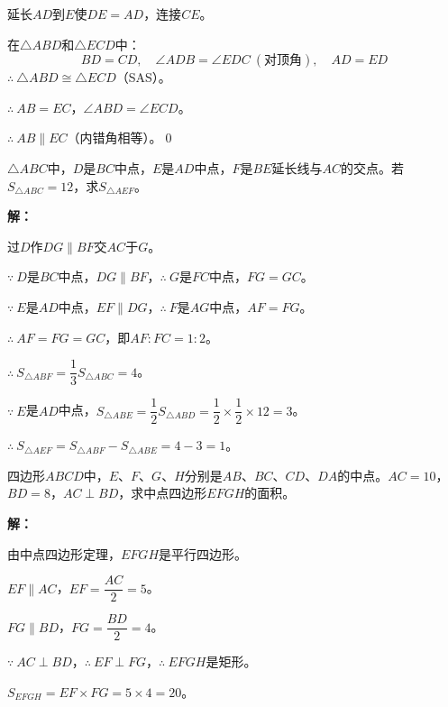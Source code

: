 \documentclass[12pt, a4paper]{ctexart}
\begin{document}
\begin{proofbox}[【证明】倍长中线]
延长$AD$到$E$使$DE = AD$，连接$CE$。

在$\triangle ABD$和$\triangle ECD$中：
\[
BD = CD,\quad \angle ADB = \angle EDC\ (\text{对顶角}),\quad AD = ED
\]
$\therefore\ \triangle ABD \cong \triangle ECD$（SAS）。

$\therefore\ AB = EC$，$\angle ABD = \angle ECD$。

$\therefore\ AB \parallel EC$（内错角相等）。\qed
\end{proofbox}

\begin{examplebox}[【例题13】倍长中线经典题]
$\triangle ABC$中，$D$是$BC$中点，$E$是$AD$中点，$F$是$BE$延长线与$AC$的交点。若$S_{\triangle ABC} = 12$，求$S_{\triangle AEF}$。
\end{examplebox}

\textbf{解：}

过$D$作$DG \parallel BF$交$AC$于$G$。

$\because\ D$是$BC$中点，$DG \parallel BF$，$\therefore\ G$是$FC$中点，$FG = GC$。

$\because\ E$是$AD$中点，$EF \parallel DG$，$\therefore\ F$是$AG$中点，$AF = FG$。

$\therefore\ AF = FG = GC$，即$AF:FC = 1:2$。

$\therefore\ S_{\triangle ABF} = \dfrac{1}{3} S_{\triangle ABC} = 4$。

$\because\ E$是$AD$中点，$S_{\triangle ABE} = \dfrac{1}{2} S_{\triangle ABD} = \dfrac{1}{2} \times \dfrac{1}{2} \times 12 = 3$。

$\therefore\ S_{\triangle AEF} = S_{\triangle ABF} - S_{\triangle ABE} = 4 - 3 = \boxed{1}$。

\begin{examplebox}[【例题14】中点四边形面积]
四边形$ABCD$中，$E$、$F$、$G$、$H$分别是$AB$、$BC$、$CD$、$DA$的中点。$AC = 10$，$BD = 8$，$AC \perp BD$，求中点四边形$EFGH$的面积。
\end{examplebox}

\textbf{解：}

由中点四边形定理，$EFGH$是平行四边形。

$EF \parallel AC$，$EF = \dfrac{AC}{2} = 5$。

$FG \parallel BD$，$FG = \dfrac{BD}{2} = 4$。

$\because\ AC \perp BD$，$\therefore\ EF \perp FG$，$\therefore\ EFGH$是矩形。

$S_{EFGH} = EF \times FG = 5 \times 4 = \boxed{20}$。
\end{document}
